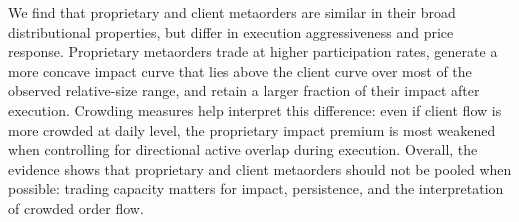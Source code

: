 \documentclass[11pt]{article}
\begin{document}




We find that proprietary and client metaorders are similar in their broad distributional properties, but differ 
in execution aggressiveness and price response. Proprietary metaorders trade at higher participation rates, 
generate a more concave impact curve that lies above the client curve over most of the observed relative-size 
range, and retain a larger fraction of their impact after execution. Crowding measures help interpret this difference: 
even if client flow is more crowded at daily level, the proprietary impact premium 
is most weakened when controlling for directional active overlap during execution. Overall, the evidence shows that 
proprietary and client metaorders should not be pooled when possible: trading capacity matters for impact, persistence, 
and the interpretation of crowded order flow.
\end{document}
